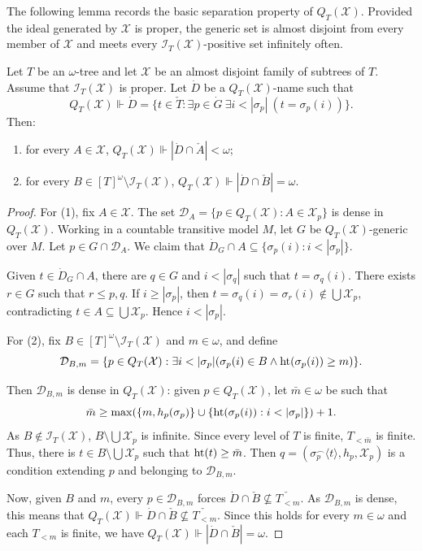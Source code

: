 The following lemma records the basic separation property of $Q_T(\mathcal X)$.
Provided the ideal generated by $\mathcal X$ is proper, the generic set is
almost disjoint from every member of $\mathcal X$ and meets every
$\mathcal I_T(\mathcal X)$-positive set infinitely often.

\begin{lemma}\label{lem:QT-adds-separator}
Let $T$ be an $\omega$-tree and let
$\mathcal X$ be an almost disjoint family of subtrees of $T$.
Assume that $\mathcal I_T(\mathcal X)$ is proper.
Let $\dot D$ be a $Q_T(\mathcal X)$-name such that
\[
  Q_T(\mathcal X)\Vdash\dot D=\{t\in \check T:\exists p\in\dot G\ \exists i<|\sigma_p|\ (t=\sigma_p(i))\}.
\]
Then:
\begin{enumerate}[label=(\arabic*)]
    \item for every $A \in \mathcal X$, $Q_T(\mathcal X)\Vdash |\dot D\cap \check A|<\omega$;
    \item for every $B \in [T]^\omega\setminus \mathcal I_T(\mathcal X)$, $Q_T(\mathcal X)\Vdash |\dot D\cap \check B|=\omega$.
\end{enumerate}
\end{lemma}

\begin{proof}
For (1), fix $A \in \mathcal X$.  The set
$\mathcal D_A=\{p\in Q_T(\mathcal X):A\in\mathcal X_p\}$ is dense in
$Q_T(\mathcal X)$.
Working in a countable transitive model $M$, let $G$ be $Q_T(\mathcal X)$-generic over $M$.
Let $p \in G\cap \mathcal D_A$.
We claim that $\dot D_G\cap A\subseteq \{\sigma_p(i):i<|\sigma_p|\}$.

Given $t \in \dot D_G\cap A$, there are $q \in G$ and $i<|\sigma_q|$ such that $t=\sigma_q(i)$.
There exists $r \in G$ such that $r \leq p,q$.
If $i\geq|\sigma_p|$, then
$t=\sigma_q(i)=\sigma_r(i)\notin \bigcup \mathcal X_p$, contradicting
$t\in A\subseteq\bigcup\mathcal X_p$.  Hence $i<|\sigma_p|$.

For (2), fix $B\in[T]^\omega\setminus \mathcal I_T(\mathcal X)$ and $m\in\omega$, and define
\[
\mathcal D_{B,m}=\{p\in Q_T(\mathcal X):\exists i<|\sigma_p|(\sigma_p(i)\in B \land \htt(\sigma_p(i))\geq m)\}.
\]

Then $\mathcal D_{B,m}$ is dense in $Q_T(\mathcal X)$: given $p \in Q_T(\mathcal X)$, let $\bar m\in \omega$ be such that
\[
\bar m\geq \max(\{m, h_p(\sigma_p)\}\cup\{\htt(\sigma_p(i)):i<|\sigma_p|\})+1.
\]
As $B\notin\mathcal I_T(\mathcal X)$, $B\setminus \bigcup\mathcal X_p$ is infinite.
Since every level of $T$ is finite, $T_{<\bar m}$ is finite.
Thus, there is $t\in B\setminus \bigcup\mathcal X_p$ such that $\operatorname{ht}(t)\geq \bar m$.
Then $q=(\sigma_p^\frown\langle t\rangle,h_p,\mathcal X_p)$ is a condition extending $p$ and belonging to $\mathcal D_{B,m}$.

Now, given $B$ and $m$, every $p \in \mathcal D_{B,m}$ forces
$\dot D\cap \check B\not\subseteq\check{T_{<m}}$.
As $\mathcal D_{B,m}$ is dense, this means that $Q_T(\mathcal X)\Vdash \dot D\cap \check B\not\subseteq \check{T_{<m}}$.
Since this holds for every $m \in \omega$ and each $T_{<m}$ is finite, we have $Q_T(\mathcal X)\Vdash |\dot D\cap \check B|=\omega$.
\end{proof}


